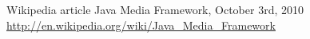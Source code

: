 \begin{thebibliography}{9999999999999}
	 Wikipedia article Java Media Framework, October 3rd, 2010\\
	\url{http://en.wikipedia.org/wiki/Java_Media_Framework}\\




	
	
	
	
	
	

\end{thebibliography}
